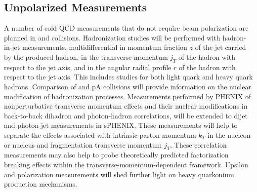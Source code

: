 \subsection {Unpolarized Measurements}

A number of cold QCD measurements that do not require beam
polarization are planned in \pp and \pA collisions. Hadronization
studies will be performed with hadron-in-jet measurements,
multidifferential in momentum fraction $z$ of the jet carried by the
produced hadron, in the transverse momentum $j_T$ of the hadron with
respect to the jet axis, and in the angular radial profile $r$ of the
hadron with respect to the jet axis. This includes studies for both
light quark and heavy quark hadrons. Comparison of \pp and pA
collisions will provide information on the nuclear modification of
hadronization processes. Measurements performed by PHENIX of
nonperturbative transverse momentum effects and their nuclear
modifications in back-to-back dihadron and photon-hadron correlations,
will be extended to dijet and photon-jet measurements in sPHENIX.
These measurements will help to separate the effects associated with
intrinsic parton momentum $k_T$ in the nucleon or nucleus and
fragmentation transverse momentum $j_T$. These correlation
measurements may also help to probe theoretically predicted
factorization breaking effects within the
transverse-momentum-dependent framework. Upsilon and \jpsi
polarization measurements will shed further light on heavy quarkonium
production mechanisms. 
